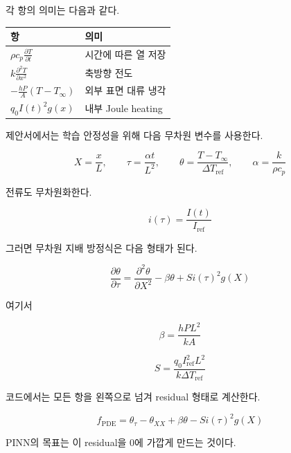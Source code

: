 \documentclass[11pt]{article}
\begin{document}
각 항의 의미는 다음과 같다.

\begin{center}
\begin{tabular}{ll}
\toprule
항 & 의미 \\
\midrule
\(\rho c_p \frac{\partial T}{\partial t}\) & 시간에 따른 열 저장 \\
\(k \frac{\partial^2 T}{\partial x^2}\) & 축방향 전도 \\
\(-\frac{hP}{A}(T-T_\infty)\) & 외부 표면 대류 냉각 \\
\(q_0 I(t)^2 g(x)\) & 내부 Joule heating \\
\bottomrule
\end{tabular}
\end{center}

제안서에서는 학습 안정성을 위해 다음 무차원 변수를 사용한다.

\begin{equation}
X = \frac{x}{L},
\qquad
\tau = \frac{\alpha t}{L^2},
\qquad
\theta = \frac{T - T_\infty}{\Delta T_{\mathrm{ref}}},
\qquad
\alpha = \frac{k}{\rho c_p}
\end{equation}

전류도 무차원화한다.

\begin{equation}
i(\tau) = \frac{I(t)}{I_{\mathrm{ref}}}
\end{equation}

그러면 무차원 지배 방정식은 다음 형태가 된다.

\begin{equation}
\frac{\partial \theta}{\partial \tau}
=
\frac{\partial^2 \theta}{\partial X^2}
-
\beta \theta
+
S i(\tau)^2 g(X)
\end{equation}

여기서

\begin{equation}
\beta =
\frac{hPL^2}{kA}
\end{equation}

\begin{equation}
S =
\frac{q_0 I_{\mathrm{ref}}^2 L^2}
{k\Delta T_{\mathrm{ref}}}
\end{equation}

코드에서는 모든 항을 왼쪽으로 넘겨 residual 형태로 계산한다.

\begin{equation}
f_{\mathrm{PDE}}
=
\theta_\tau
-
\theta_{XX}
+
\beta \theta
-
S i(\tau)^2 g(X)
\end{equation}

PINN의 목표는 이 residual을 0에 가깝게 만드는 것이다.
\end{document}
